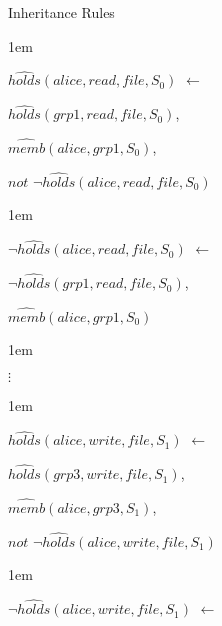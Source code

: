 \documentclass[glov2,twocolumn,final]{svjour2}
\newenvironment{vquote}
  {\begin{list}{}{\leftmargin 1em}\item[]}
  {\end{list}}
\begin{document}
\begin{enumerate}
       \item
         Inheritance Rules

         \begin{vquote}
           $\hat{holds}(alice, read, file, S_{0})$ $\leftarrow$

           \hspace{1em}
           $\hat{holds}(grp1, read, file, S_{0})$,

           \hspace{1em}
           $\hat{memb}(alice, grp1, S_{0})$,

           \hspace{1em}
           $not$ $\lnot\hat{holds}(alice, read, file, S_{0})$
         \end{vquote}

         \begin{vquote}
           $\lnot\hat{holds}(alice, read, file, S_{0})$ $\leftarrow$

           \hspace{1em}
           $\lnot\hat{holds}(grp1, read, file, S_{0})$,

           \hspace{1em}
           $\hat{memb}(alice, grp1, S_{0})$
         \end{vquote}

         \begin{vquote}
           \hspace{2em}$\vdots$
         \end{vquote}

         \begin{vquote}
           $\hat{holds}(alice, write, file, S_{1})$ $\leftarrow$

           \hspace{1em}
           $\hat{holds}(grp3, write, file, S_{1})$,

           \hspace{1em}
           $\hat{memb}(alice, grp3, S_{1})$,

           \hspace{1em}
           $not$ $\lnot\hat{holds}(alice, write, file, S_{1})$
         \end{vquote}

         \begin{vquote}
           $\lnot\hat{holds}(alice, write, file, S_{1})$ $\leftarrow$


\end{vquote}
\end{enumerate}
\end{document}
